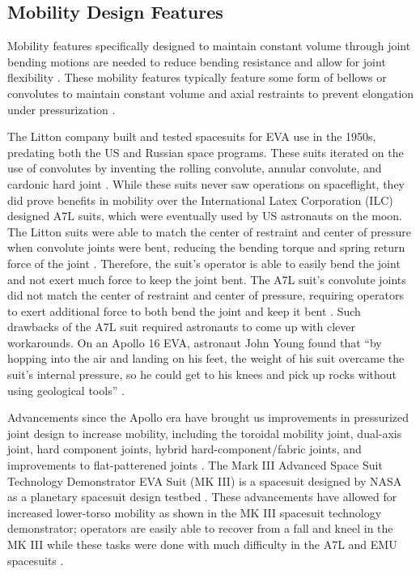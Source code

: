 \documentclass[defaultstyle,11pt]{comps}
\begin{document}
\hypertarget{mobility-design-features}{%
\subsection{Mobility Design Features}\label{mobility-design-features}}

Mobility features specifically designed to maintain constant volume through joint bending motions are needed to reduce bending resistance and allow for joint flexibility \citep{Harris2001}.
These mobility features typically feature some form of bellows or convolutes to maintain constant volume and axial restraints to prevent elongation under pressurization \citep{Harris2001}.

The Litton company built and tested spacesuits for EVA use in the 1950s, predating both the US and Russian space programs.
These suits iterated on the use of convolutes by inventing the rolling convolute, annular convolute, and cardonic hard joint \citep{Harris2001}.
While these suits never saw operations on spaceflight, they did prove benefits in mobility over the International Latex Corporation (ILC) designed A7L suits, which were eventually used by US astronauts on the moon.
The Litton suits were able to match the center of restraint and center of pressure when convolute joints were bent, reducing the bending torque and spring return force of the joint \citep{Harris2001}.
Therefore, the suit's operator is able to easily bend the joint and not exert much force to keep the joint bent.
The A7L suit's convolute joints did not match the center of restraint and center of pressure, requiring operators to exert additional force to both bend the joint and keep it bent \citep{Harris2001}.
Such drawbacks of the A7L suit required astronauts to come up with clever workarounds.
On an Apollo 16 EVA, astronaut John Young found that ``by hopping into the air and landing on his feet, the weight of his suit overcame the suit's internal pressure, so he could get to his knees and pick up rocks without using geological tools'' \citep{Portree1997}.

Advancements since the Apollo era have brought us improvements in pressurized joint design to increase mobility, including the toroidal mobility joint, dual-axis joint, hard component joints, hybrid hard-component/fabric joints, and improvements to flat-patterened joints \citep{Harris2001}.
The Mark III Advanced Space Suit Technology Demonstrator EVA Suit (MK III) is a spacesuit designed by NASA as a planetary spacesuit design testbed \citep{Kosmo1988}.
These advancements have allowed for increased lower-torso mobility as shown in the MK III spacesuit technology demonstrator; operators are easily able to recover from a fall and kneel in the MK III while these tasks were done with much difficulty in the A7L and EMU spacesuits \citep{Kosmo1998}.
\end{document}

